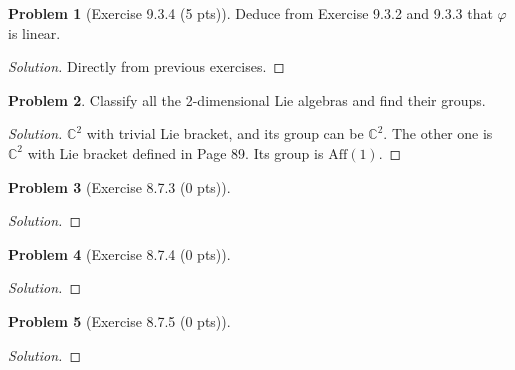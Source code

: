 \documentclass{article}
\theoremstyle{definition}
\newtheorem{problem}{Problem}
\theoremstyle{plain}
\begin{document}
\begin{problem}[Exercise 9.3.4 (5 pts)]
Deduce from Exercise 9.3.2 and 9.3.3 that $\varphi$ is linear.
\end{problem}
\begin{adjustwidth}{0.7cm}{}
\color{blue}
\begin{proof}[Solution]
Directly from previous exercises.
\color{black}
\end{proof}
\end{adjustwidth}

\begin{problem}Classify all the 2-dimensional Lie algebras and find their groups.
\end{problem}
\begin{adjustwidth}{0.7cm}{}
\color{blue}
\begin{proof}[Solution]
$\mathbb{C}^2$ with trivial Lie bracket, and its group can be $\mathbb{C}^2$. The other one is $\mathbb{C}^2$ with Lie bracket defined in Page 89. Its group is $\mathrm{Aff}(1)$.
\color{black}
\end{proof}
\end{adjustwidth}

\begin{problem}[Exercise 8.7.3 (0 pts)]
\end{problem}
\begin{adjustwidth}{0.7cm}{}
\color{blue}
\begin{proof}[Solution]
\color{black}
\end{proof}
\end{adjustwidth}

\begin{problem}[Exercise 8.7.4 (0 pts)]
\end{problem}
\begin{adjustwidth}{0.7cm}{}
\color{blue}
\begin{proof}[Solution]
\color{black}
\end{proof}
\end{adjustwidth}

\begin{problem}[Exercise 8.7.5 (0 pts)]
\end{problem}
\begin{adjustwidth}{0.7cm}{}
\color{blue}
\begin{proof}[Solution]
\color{black}
\end{proof}
\end{adjustwidth}
\end{document}
